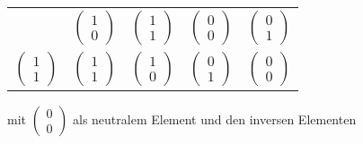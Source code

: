 \documentclass{scrreprt}
\begin{document}
\begin{enumerate}[(i)]
\begin{tabular}{|c|cccc|}
    & $\begin{pmatrix} 1 \\ 0 \end{pmatrix}$
    & $\begin{pmatrix} 1 \\ 1 \end{pmatrix}$
    & $\begin{pmatrix} 0 \\ 0 \end{pmatrix}$
    & $\begin{pmatrix} 0 \\ 1 \end{pmatrix}$ \\
    $\begin{pmatrix} 1 \\ 1 \end{pmatrix}$
    & $\begin{pmatrix} 1 \\ 1 \end{pmatrix}$
    & $\begin{pmatrix} 1 \\ 0 \end{pmatrix}$
    & $\begin{pmatrix} 0 \\ 1 \end{pmatrix}$
    & $\begin{pmatrix} 0 \\ 0 \end{pmatrix}$ \\
    \hline
  \end{tabular}

  mit $\begin{pmatrix} 0 \\ 0 \end{pmatrix}$ als neutralem Element und den
  inversen Elementen


\end{enumerate}
\end{document}
